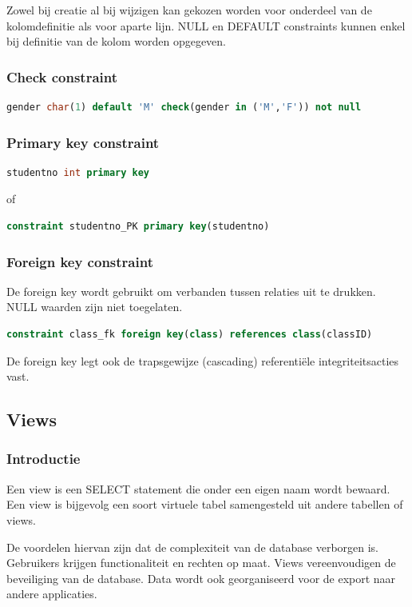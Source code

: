\documentclass[a4paper,12pt]{article}
\begin{document}
Zowel bij creatie al bij wijzigen kan gekozen worden voor onderdeel van de kolomdefinitie als voor aparte lijn.
NULL en DEFAULT constraints kunnen enkel bij definitie van de kolom worden opgegeven.

\subsubsection{Check constraint}
\begin{lstlisting}[language=sql, breaklines=true]
gender char(1) default 'M' check(gender in ('M','F')) not null
\end{lstlisting}

\subsubsection{Primary key constraint}
\begin{lstlisting}[language=sql, breaklines=true]
studentno int primary key
\end{lstlisting}

of

\begin{lstlisting}[language=sql, breaklines=true]
constraint studentno_PK primary key(studentno)
\end{lstlisting}

\subsubsection{Foreign key constraint}
De foreign key wordt gebruikt om verbanden tussen relaties uit te drukken. NULL waarden zijn niet toegelaten.
\begin{lstlisting}[language=sql, breaklines=true]
constraint class_fk foreign key(class) references class(classID)
\end{lstlisting}
De foreign key legt ook de trapsgewijze (cascading) referentiële integriteitsacties vast.

\subsection{Views}
\subsubsection{Introductie}
Een view is een SELECT statement die onder een eigen naam wordt bewaard.
Een view is bijgevolg een soort virtuele tabel samengesteld uit andere tabellen of views.

De voordelen hiervan zijn dat de complexiteit van de database verborgen is.
Gebruikers krijgen functionaliteit en rechten op maat.
Views vereenvoudigen de beveiliging van de database.
Data wordt ook georganiseerd voor de export naar andere applicaties.
\end{document}
